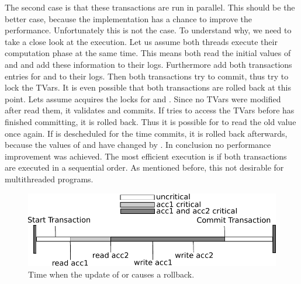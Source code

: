 The second case is that these transactions are run in parallel. This should be the better case, because the implementation
has a chance to improve the performance. Unfortunately this is not the case. To understand why, we need to take a close look at 
the execution. Let us assume both threads execute their computation phase at the same time. This means both read the initial 
values of  and  and add these information to their logs. Furthermore add both transactions 
entries for  and  to their logs. Then both transactions try to commit, thus try to lock 
the TVars. It is even possible that both transactions are rolled back at this point. Lets assume  acquires the locks 
for  and . Since no TVars were modified after  read them, it validates and commits.
If  tries to access the TVars before  has finished committing, it is rolled back. 
Thus it is possible for  to read the old value once again. If  is descheduled for the time
 commits, it is rolled back afterwards, because the values of  and  have changed 
by . In conclusion no performance improvement was achieved. The most efficient execution is if both transactions
are executed in a sequential order. As mentioned before, this not desirable for multithreaded programs.

\begin{figure}
\centering
\includegraphics{Figures/CriticalValue}
\decoRule
\caption[Critical Value I]{Time when the update of  or  causes a rollback.}
\label{fig:criticalValue}
\end{figure}

